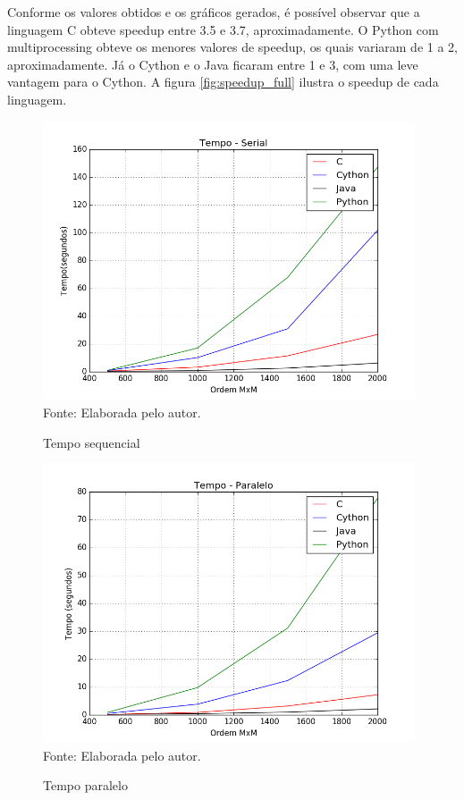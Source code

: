 \documentclass[a4paper,12pt]{article}
\begin{document}
Conforme os valores obtidos e os gráficos gerados, é possível observar que a linguagem C obteve speedup entre 3.5 e 3.7, aproximadamente. O Python com multiprocessing obteve os menores valores de speedup, os quais variaram de 1 a 2, aproximadamente. Já o Cython e o Java ficaram entre 1 e 3, com uma leve vantagem para o Cython. A figura \ref{fig:speedup_full} ilustra o speedup de cada linguagem. 


\begin{figure}[H]
  \centering
  \caption{Tempo sequencial}
  \includegraphics[width=11.0cm]{pictures/tempo_serial.png}\vfill
  \footnotesize{Fonte: Elaborada pelo autor.}
  
\label{fig:tempo_serial}
\end{figure}

\begin{figure}[H]
  \centering
  \caption{Tempo paralelo}
  \includegraphics[width=11.0cm]{pictures/tempo_paralelo.png}\vfill
  \footnotesize{Fonte: Elaborada pelo autor.}
  
\label{fig:tempo_paralelo}
\end{figure}
\end{document}

